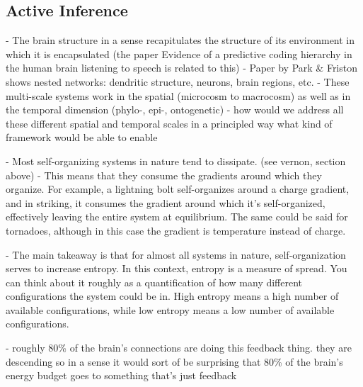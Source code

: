 \subsection{Active Inference} 



- The brain structure in a sense recapitulates the structure of its environment in which it is encapsulated
    (the paper Evidence of a predictive coding hierarchy in the human brain listening to speech is related to this)
- Paper by Park \& Friston shows nested networks: dendritic structure, neurons, brain regions, etc. 
- These multi-scale systems work in the spatial (microcosm to macrocosm) as well as in the temporal dimension (phylo-, epi-, ontogenetic)
- how would we address all these different spatial and temporal scales in a principled way what kind of framework would be able to enable


- Most self-organizing systems in nature tend to dissipate. (see vernon, section above)
- This means that they consume the gradients around which they organize. For example, a lightning bolt self-organizes around a charge gradient, and in striking, it consumes the gradient around which it's self-organized, effectively leaving the entire system at equilibrium. The same could be said for tornadoes, although in this case the gradient is temperature instead of charge.

- The main takeaway is that for almost all systems in nature, self-organization serves to increase entropy. In this context, entropy is a measure of spread. You can think about it roughly as a quantification of how many different configurations the system could be in. High entropy means a high number of available configurations, while low entropy means a low number of available configurations.

- roughly 80\% of the brain's connections are doing this feedback thing. they are descending so in a sense it would sort of be surprising that 80\% of the brain's energy budget goes to something that's just feedback

